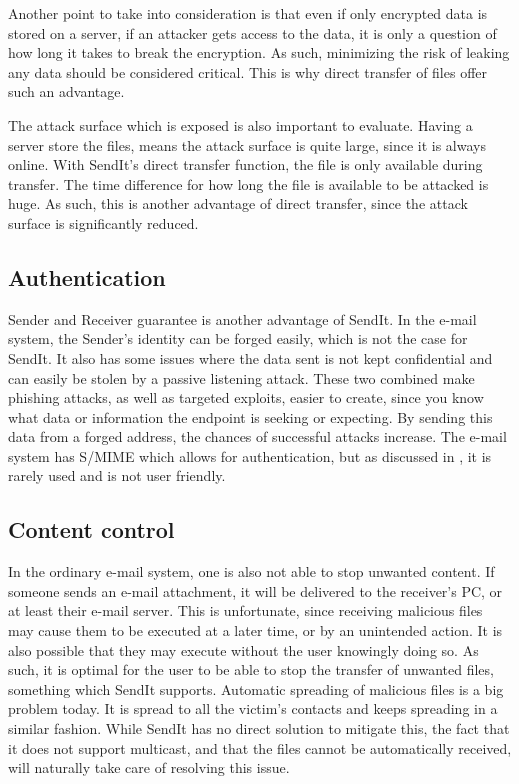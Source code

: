  Another point to take into consideration is that even if only encrypted data is stored on a server, if an attacker gets access to the data, it is only a question of how long it takes to break the encryption. As such, minimizing the risk of leaking any data should be considered critical. This is why direct transfer of files offer such an advantage.

  The attack surface which is exposed is also important to evaluate. Having a server store the files, means the attack surface is quite large, since it is always online. With SendIt's direct transfer function, the file is only available during transfer. The time difference for how long the file is available to be attacked is huge. As such, this is another advantage of direct transfer, since the attack surface is significantly reduced.
%
  \subsection{Authentication}
  Sender and Receiver guarantee is another advantage of SendIt. In the e-mail system, the Sender's identity can be forged easily, which is not the case for SendIt. It also has some issues where the data sent is not kept confidential and can easily be stolen by a passive listening attack. These two combined make phishing attacks, as well as targeted exploits, easier to create, since you know what data or information the endpoint is seeking or expecting. By sending this data from a forged address, the chances of successful attacks increase. The e-mail system has S/MIME which allows for authentication, but as discussed in , it is rarely used and is not user friendly.
  \subsection{Content control}
  In the ordinary e-mail system, one is also not able to stop unwanted content. If someone sends an e-mail attachment, it will be delivered to the receiver's PC, or at least their e-mail server. This is unfortunate, since receiving malicious files may cause them to be executed at a later time, or by an unintended action. It is also possible that they may execute without the user knowingly doing so. As such, it is optimal for the user to be able to stop the transfer of unwanted files, something which SendIt supports.
  Automatic spreading of malicious files is a big problem today. It is spread to all the victim's contacts and keeps spreading in a similar fashion. While SendIt has no direct solution to mitigate this, the fact that it does not support multicast, and that the files cannot be automatically received, will naturally take care of resolving this issue.
%
%

